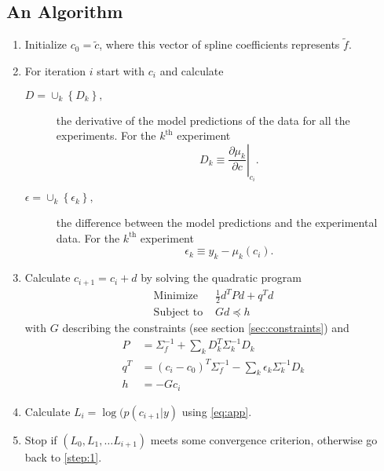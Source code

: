 \documentclass[11pt]{article}
\newcommand{\eos}{f}
\newcommand{\data}{y}
\begin{document}
\subsection{An Algorithm}
\label{sec:algorithm}

\begin{enumerate}
\item \label{step:0} Initialize $c_0 = \tilde c$, where this vector of
  spline coefficients represents $\tilde \eos$.
\item \label{step:1} For iteration $i$ start with $c_i$ and
  calculate
  \begin{description}
  \item[$D=\cup_k \left\{ D_k \right\},$] the derivative of the model
    predictions of the data for all the experiments.  For the
    $k^{\text{th}}$ experiment
    \begin{equation*}
      D_k \equiv \left. \frac{\partial\mu_k}{\partial c}
      \right|_{c_i} .
    \end{equation*}
  \item[$\epsilon=\cup_k \left\{ \epsilon_k \right\},$] the difference
    between the model predictions and the experimental data.  For the
    $k^{\text{th}}$ experiment
    \begin{equation*}
      \epsilon_k \equiv \data_k - \mu_k(c_i) .
    \end{equation*}
  \end{description}
\item \label{step:2} Calculate $c_{i+1} = c_i + d$ by solving
  the quadratic program
\begin{subequations}
  \label{eq:dhat}
  \begin{align}
    \text{Minimize } & \frac{1}{2} d^T P d + q^T d \\
  \label{eq:dhatb}
    \text{Subject to } & Gd \preceq h
  \end{align}
\end{subequations}
with $G$ describing the constraints (see section
\ref{sec:constraints}) and
\begin{subequations}
  \label{eq:opt}
  \begin{align}
    P &= \Sigma_\eos^{-1} + \sum_k D_k^T\Sigma_k^{-1} D_k \\
    q^T &= (c_i - c_0)^T \Sigma_\eos^{-1} - \sum_k \epsilon_k
          \Sigma_k^{-1} D_k \\
    h &= -Gc_i
  \end{align}
\end{subequations}
\item \label{step:3} Calculate $L_i = \log(p(c_{i+1}|\data)$ using
  \eqref{eq:app}.
\item \label{step:4} Stop if $\left( L_0, L_1, \ldots L_{i+1} \right)$
  meets some convergence criterion, otherwise go back to \ref{step:1}.
\end{enumerate}
\end{document}

